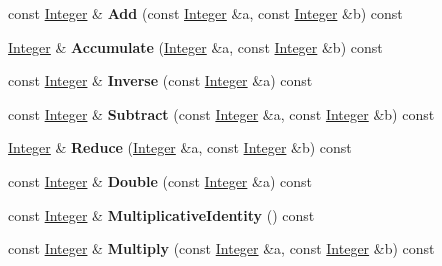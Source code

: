 \begin{DoxyCompactItemize}
\item 
\hypertarget{class_modular_arithmetic_a1adc764c4542934761bd5fa8a300a1cc}{
const \hyperlink{class_integer}{Integer} \& {\bfseries Add} (const \hyperlink{class_integer}{Integer} \&a, const \hyperlink{class_integer}{Integer} \&b) const }
\label{class_modular_arithmetic_a1adc764c4542934761bd5fa8a300a1cc}

\item 
\hypertarget{class_modular_arithmetic_a423acea55882dbc3cf29f5f3321d7eaf}{
\hyperlink{class_integer}{Integer} \& {\bfseries Accumulate} (\hyperlink{class_integer}{Integer} \&a, const \hyperlink{class_integer}{Integer} \&b) const }
\label{class_modular_arithmetic_a423acea55882dbc3cf29f5f3321d7eaf}

\item 
\hypertarget{class_modular_arithmetic_a0eef4ed8254453725c38f19ddca16240}{
const \hyperlink{class_integer}{Integer} \& {\bfseries Inverse} (const \hyperlink{class_integer}{Integer} \&a) const }
\label{class_modular_arithmetic_a0eef4ed8254453725c38f19ddca16240}

\item 
\hypertarget{class_modular_arithmetic_a3c3ca18ad6e1da2ecca2b0ce7a7c8505}{
const \hyperlink{class_integer}{Integer} \& {\bfseries Subtract} (const \hyperlink{class_integer}{Integer} \&a, const \hyperlink{class_integer}{Integer} \&b) const }
\label{class_modular_arithmetic_a3c3ca18ad6e1da2ecca2b0ce7a7c8505}

\item 
\hypertarget{class_modular_arithmetic_a23c03922ded5aa4781dd17f68d817af7}{
\hyperlink{class_integer}{Integer} \& {\bfseries Reduce} (\hyperlink{class_integer}{Integer} \&a, const \hyperlink{class_integer}{Integer} \&b) const }
\label{class_modular_arithmetic_a23c03922ded5aa4781dd17f68d817af7}

\item 
\hypertarget{class_modular_arithmetic_a2704ef13b1d9109569613196de4a4915}{
const \hyperlink{class_integer}{Integer} \& {\bfseries Double} (const \hyperlink{class_integer}{Integer} \&a) const }
\label{class_modular_arithmetic_a2704ef13b1d9109569613196de4a4915}

\item 
\hypertarget{class_modular_arithmetic_a5284c7c57ed71408c09f85f195df9025}{
const \hyperlink{class_integer}{Integer} \& {\bfseries MultiplicativeIdentity} () const }
\label{class_modular_arithmetic_a5284c7c57ed71408c09f85f195df9025}

\item 
\hypertarget{class_modular_arithmetic_a3f41c5971bea03e3701b0e5378a6f9fa}{
const \hyperlink{class_integer}{Integer} \& {\bfseries Multiply} (const \hyperlink{class_integer}{Integer} \&a, const \hyperlink{class_integer}{Integer} \&b) const }
\label{class_modular_arithmetic_a3f41c5971bea03e3701b0e5378a6f9fa}


\end{DoxyCompactItemize}
